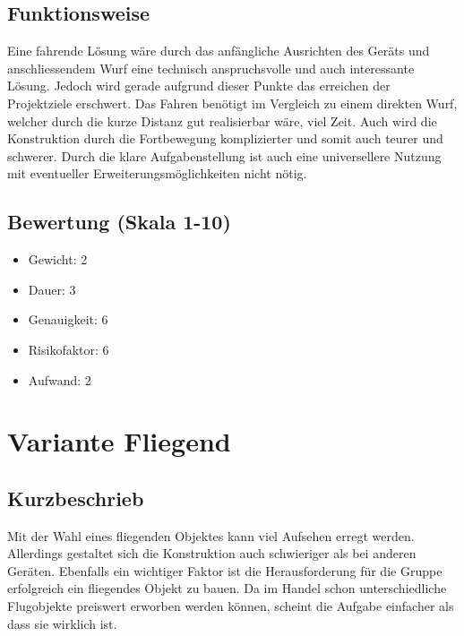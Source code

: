 \begin{landscape}
\subsection{Funktionsweise}
Eine fahrende Lösung wäre durch das anfängliche Ausrichten des Geräts und anschliessendem Wurf eine technisch anspruchsvolle und auch interessante Lösung. Jedoch wird gerade aufgrund dieser Punkte das erreichen der Projektziele erschwert. Das Fahren benötigt im Vergleich zu einem direkten Wurf, welcher durch die kurze Distanz gut realisierbar wäre, viel Zeit. Auch wird die Konstruktion durch die Fortbewegung komplizierter und somit auch teurer und schwerer. Durch die klare Aufgabenstellung ist auch eine universellere Nutzung mit eventueller Erweiterungsmöglichkeiten nicht nötig. 

\subsection{Bewertung (Skala 1-10)}
\begin{minipage}{\textwidth}
    \begin{itemize}
        \item Gewicht: 2
        \item Dauer: 3
        \item Genauigkeit: 6
        \item Risikofaktor: 6
        \item Aufwand: 2
    \end{itemize}
\end{minipage}

\clearpage

\section{Variante Fliegend}
\subsection{Kurzbeschrieb}
Mit der Wahl eines fliegenden Objektes kann viel Aufsehen erregt werden. Allerdings gestaltet sich die Konstruktion auch schwieriger als bei anderen Geräten. Ebenfalls ein wichtiger Faktor ist die Herausforderung für die Gruppe erfolgreich ein fliegendes Objekt zu bauen. Da im Handel schon unterschiedliche Flugobjekte preiswert erworben werden können, scheint die Aufgabe einfacher als dass sie wirklich ist.


\end{landscape}
